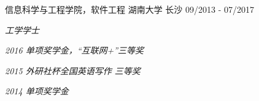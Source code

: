 \begin{cventries}
  \cventry
    {信息科学与工程学院，软件工程}
    {湖南大学}
    {长沙}
    {09/2013 - 07/2017}
    {
      \begin{cvitems}
        \item {\itshape{工学学士}}
        \item {\itshape{2016 单项奖学金，“互联网+”三等奖}}
        \item {\itshape{2015 外研社杯全国英语写作 三等奖}}
        \item {\itshape{2014 单项奖学金}}
      \end{cvitems}
    }
\end{cventries}

